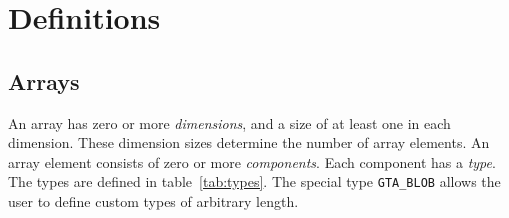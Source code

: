 \documentclass[a4paper,11pt]{article}
\newcommand{\code}[1]{\texttt{#1}}
\begin{document}
\section{Definitions}

\subsection{Arrays}

An array has zero or more \emph{dimensions}, and a size of at least one in each
dimension. These dimension sizes determine the number of array elements.
An array element consists of zero or more \emph{components}.
Each component has a \emph{type}. The types are defined in table~\ref{tab:types}.
The special type \code{GTA\_BLOB} allows the user to define custom types
of arbitrary length.
\end{document}
